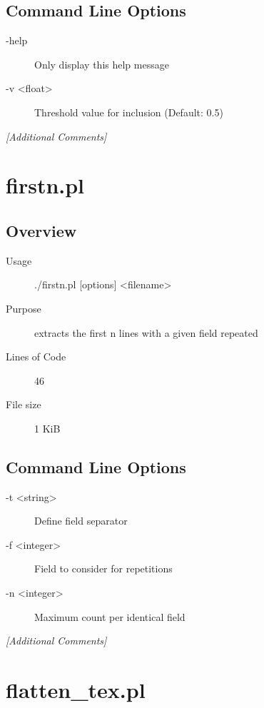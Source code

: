 \subsection{Command Line Options}
\label{sec:filterdiff.pl-command-line}

\begin{description}
\item[-help] Only display this help message
\item[-v <float>] Threshold value for inclusion (Default: 0.5)
\end{description}

\emph{[Additional Comments]}

\section{firstn.pl}
\label{sec:firstn.pl}

\subsection{Overview}
\label{sec:firstn.pl-overview}

\begin{description}
\item[Usage] ./firstn.pl [options] <filename>
\item[Purpose] extracts the first n lines with a given field repeated
\item[Lines of Code] 46
\item[File size] 1 KiB
\end{description}

\subsection{Command Line Options}
\label{sec:firstn.pl-command-line}

\begin{description}
\item[-t <string>] Define field separator
\item[-f <integer>] Field to consider for repetitions
\item[-n <integer>] Maximum count per identical field
\end{description}

\emph{[Additional Comments]}

\section{flatten_tex.pl}
\label{sec:flatten-tex.pl}


